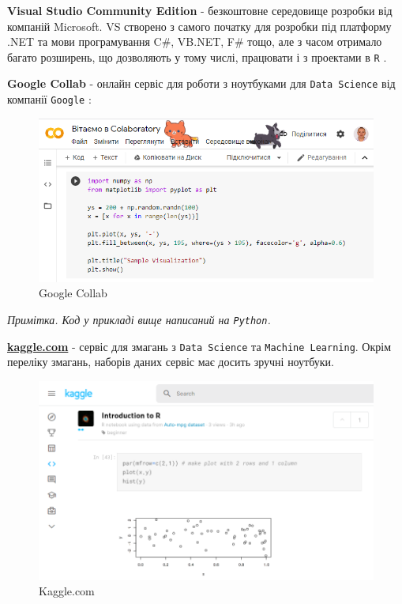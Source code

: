\documentclass[
]{book}
\begin{document}
\textbf{Visual Studio Community Edition} - безкоштовне середовище розробки від компаній Microsoft. VS створено з самого початку для розробки під платформу .NET та мови програмування C\#, VB.NET, F\# тощо, але з часом отримало багато розширень, що дозволяють у тому числі, працювати і з проектами в \texttt{R} \citep{visual-studio}.

\textbf{Google Collab} - онлайн сервіс для роботи з ноутбуками для \texttt{Data\ Science} від компанії \texttt{Google} \citep{google-collab}:

\begin{figure}
\centering
\includegraphics{images/chapter1/google_collab.png}
\caption{\label{fig:unnamed-chunk-29}Google Collab}
\end{figure}

\emph{Примітка. Код у прикладі вище написаний на \texttt{Python}.}

\href{https://kaggle.com}{\textbf{kaggle.com}} - сервіс для змагань з \texttt{Data\ Science} та \texttt{Machine\ Learning}. Окрім переліку змагань, наборів даних сервіс має досить зручні ноутбуки.

\begin{figure}
\centering
\includegraphics{images/chapter1/kaggle.png}
\caption{\label{fig:unnamed-chunk-30}Kaggle.com}
\end{figure}
\end{document}
